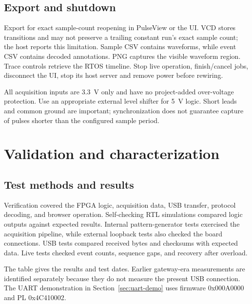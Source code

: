 \documentclass[11pt,a4paper]{article}
\newcommand{\code}[1]{\texttt{\detokenize{#1}}}
\begin{document}
\subsection{Export and shutdown}

Export \code{.sr} for exact sample-count reopening in PulseView or the UI. VCD
stores transitions and may not preserve a trailing constant run's exact sample
count; the host reports this limitation. Sample CSV contains waveforms, while
event CSV contains decoded annotations. PNG captures the visible waveform region.
Trace controls retrieve the RTOS timeline. Stop live operation, finish/cancel
jobs, disconnect the UI, stop its host server and remove power before rewiring.

All acquisition inputs are 3.3~V only and have no project-added over-voltage
protection. Use an appropriate external level shifter for 5~V logic. Short leads
and common ground are important; synchronization does not guarantee capture of
pulses shorter than the configured sample period.

\section{Validation and characterization}

\subsection{Test methods and results}

Verification covered the FPGA logic, acquisition data, USB transfer, protocol
decoding, and browser operation. Self-checking RTL simulations compared logic
outputs against expected results. Internal pattern-generator tests exercised
the acquisition pipeline, while external loopback tests also checked the board
connections. USB tests compared received bytes and checksums with expected data.
Live tests checked event counts, sequence gaps, and recovery after overload.

The table gives the results and test dates. Earlier gateway-era measurements are
identified separately because they do not measure the present USB connection.
The UART demonstration in Section~\ref{sec:uart-demo} uses firmware 0x000A0000
and PL 0x4C410002.
\end{document}

